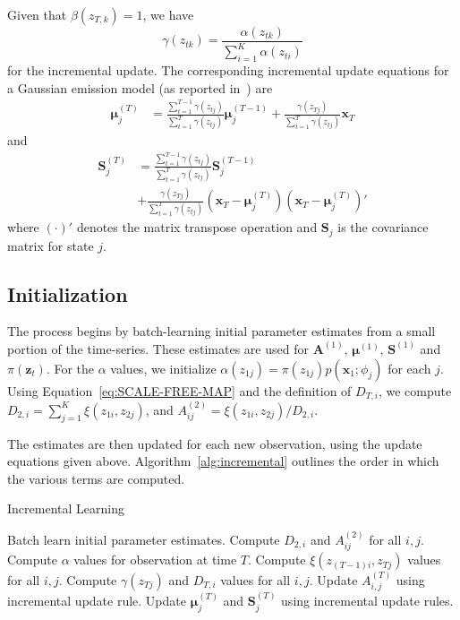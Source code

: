 \documentclass{article}
\begin{document}
Given that $\beta(z_{T,k}) = 1$, we have 
\[
    \gamma(z_{tk}) = \frac{\alpha(z_{tk})}{\sum_{i=1}^{K}\alpha(z_{ti})}
\]
for the incremental update. The corresponding incremental update equations for a Gaussian emission model (as reported in~\cite{stenger2001}) are 
\begin{align*}
    \mathbf{\mu}_{j}^{(T)} &= \frac{\sum_{t=1}^{T-1}\gamma(z_{tj})}{\sum_{t=1}^{T}\gamma(z_{tj})}\mathbf{\mu}_{j}^{(T-1)} + \frac{\gamma(z_{Tj})}{\sum_{t=1}^{T}\gamma(z_{tj})}\mathbf{x}_T
\end{align*}
and
\begin{align*}
    \mathbf{S}_j^{(T)} &= \frac{\sum_{t=1}^{T-1}\gamma(z_{tj})}{\sum_{t=1}^{T}\gamma(z_{tj})}\mathbf{S}_j^{(T-1)} \\
                       &+ \frac{\gamma(z_{Tj})}{\sum_{t=1}^{T}\gamma(z_{tj})}\left(\mathbf{x}_T - \mathbf{\mu}_j^{(T)}\right)\left(\mathbf{x}_T - \mathbf{\mu}_j^{(T)}\right)'
\end{align*}
where $(\cdot)'$ denotes the matrix transpose operation and $\mathbf{S}_j$ is the covariance matrix for state $j$.

\subsection{Initialization}

The process begins by batch-learning initial parameter estimates from a small
portion of the time-series. These estimates are used for $\mathbf{A}^{(1)}$,
$\mathbf{\mu}^{(1)}$, $\mathbf{S}^{(1)}$ and $\pi(\mathbf{z}_t)$. For the
$\alpha$ values, we initialize $\alpha(z_{1j}) = \pi(z_{1j})p(\mathbf{x}_1;
\phi_j)$ for each $j$. Using Equation~\ref{eq:SCALE-FREE-MAP} and the definition
of $D_{T,i}$, we compute $D_{2,i} = \sum_{j=1}^{K} \xi(z_{1i}, z_{2j})$, and 
$A_{ij}^{(2)} = \xi(z_{1i}, z_{2j})/D_{2,i}$.

The estimates are then updated for each new observation, using the update equations given above. Algorithm~\ref{alg:incremental} outlines the order in which the various terms are computed.

\begin{algorithm}
\caption{Incremental Learning}
\small
\begin{algorithmic}[1]
\State Batch learn initial parameter estimates.
\State Compute $D_{2,i}$ and $A_{ij}^{(2)}$ for all $i,j$.
\State Compute $\alpha$ values for observation at time $T$.
\State Compute $\xi(z_{(T-1)i},z_{Tj})$ values for all $i,j$.
\State Compute $\gamma(z_{Tj})$ and $D_{T,i}$ values for all $i,j$.
\State Update $A_{i,j}^{(T)}$ using incremental update rule.
\State Update $\mathbf{\mu}_{j}^{(T)}$ and $\mathbf{S}_{j}^{(T)}$ using incremental update rules.
\EndFor
\end{algorithmic}
\label{alg:incremental}
\end{algorithm}
\end{document}
